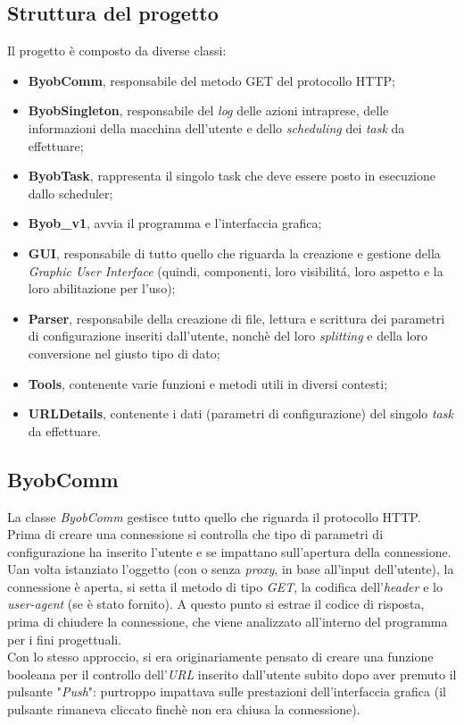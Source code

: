 \subsection{Struttura del progetto}
Il progetto \`e composto da diverse classi:
\begin{itemize}
\item \textbf{ByobComm}, responsabile del metodo GET del protocollo HTTP;
\item \textbf{ByobSingleton}, responsabile del \textit{log} delle azioni intraprese, delle informazioni della macchina dell'utente e dello \textit{scheduling} dei \textit{task} da effettuare;
\item \textbf{ByobTask}, rappresenta il singolo task che deve essere posto in esecuzione dallo scheduler;
\item \textbf{Byob\_v1}, avvia il programma e l'interfaccia grafica;
\item \textbf{GUI}, responsabile di tutto quello che riguarda la creazione e gestione della \textit{Graphic User Interface} (quindi, componenti, loro visibilit\'a, loro aspetto e la loro abilitazione per l'uso);
\item \textbf{Parser}, responsabile della creazione di file, lettura e scrittura dei parametri di configurazione inseriti dall'utente, nonch\`e del loro \textit{splitting} e della loro conversione nel giusto tipo di dato;
\item \textbf{Tools}, contenente varie funzioni e metodi utili in diversi contesti;
\item \textbf{URLDetails}, contenente i dati (parametri di configurazione) del singolo \textit{task} da effettuare.
\end{itemize} 

\vspace*{0.5cm}
\subsection{ByobComm}
La classe \textit{ByobComm} gestisce tutto quello che riguarda il protocollo HTTP.\\
Prima di creare una connessione si controlla che tipo di parametri di configurazione ha inserito l'utente e se impattano sull'apertura della connessione. Uan volta istanziato l'oggetto (con o senza \textit{proxy}, in base all'input dell'utente), la connessione \`e aperta, si setta il metodo di tipo \textit{GET}, la codifica dell'\textit{header} e lo \textit{user-agent} (se \`e stato fornito). A questo punto si estrae il codice di risposta, prima di chiudere la connessione, che viene analizzato all'interno del programma per i fini progettuali. \\
Con lo stesso approccio, si era originariamente pensato di creare una funzione booleana per il controllo dell'\textit{URL} inserito dall'utente subito dopo aver premuto il pulsante "\textit{Push}": purtroppo impattava sulle prestazioni dell'interfaccia grafica (il pulsante rimaneva cliccato finch\`e non era chiusa la connessione).


